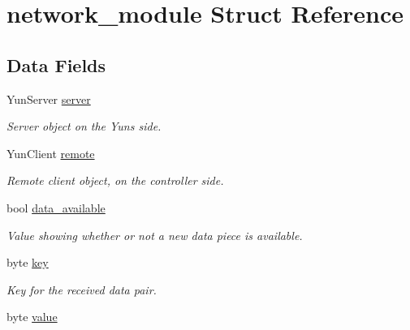 \hypertarget{structnetwork__module}{}\section{network\+\_\+module Struct Reference}
\label{structnetwork__module}
\subsection*{Data Fields}
\begin{DoxyCompactItemize}
\item 
Yun\+Server \hyperlink{structnetwork__module_a82b787509d4348843a4831156866c57e}{server}
\begin{DoxyCompactList}\small\item\em Server object on the Yun\textquotesingle{}s side. \end{DoxyCompactList}\item 
Yun\+Client \hyperlink{structnetwork__module_a2422beb02be2c0bcef02bbbbc43252fe}{remote}
\begin{DoxyCompactList}\small\item\em Remote client object, on the controller side. \end{DoxyCompactList}\item 
bool \hyperlink{structnetwork__module_ac0b46ce8ff26aba526e40974b4658d5f}{data\+\_\+available}
\begin{DoxyCompactList}\small\item\em Value showing whether or not a new data piece is available. \end{DoxyCompactList}\item 
\hypertarget{structnetwork__module_ab9c0b475bf19d9e23331829d317b15ef}{}byte \hyperlink{structnetwork__module_ab9c0b475bf19d9e23331829d317b15ef}{key}\label{structnetwork__module_ab9c0b475bf19d9e23331829d317b15ef}

\begin{DoxyCompactList}\small\item\em Key for the received data pair. \end{DoxyCompactList}\item 
\hypertarget{structnetwork__module_afc265eebfd75124019486aba98219e20}{}byte \hyperlink{structnetwork__module_afc265eebfd75124019486aba98219e20}{value}\label{structnetwork__module_afc265eebfd75124019486aba98219e20}


\end{DoxyCompactItemize}
